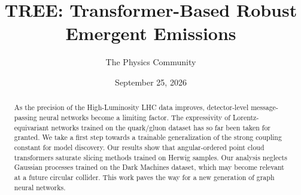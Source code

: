 \documentclass[11pt]{article}
\title{TREE: Transformer-Based Robust Emergent Emissions}
\author{The Physics Community}
\date{September 25, 2026}
\begin{document}
\maketitle
\begin{abstract}
As the precision of the High-Luminosity LHC data improves,
detector-level message-passing neural networks become a limiting factor.
The expressivity of Lorentz-equivariant networks trained on the
quark/gluon dataset has so far been taken for granted. We take a first
step towards a trainable generalization of the strong coupling constant
for model discovery. Our results show that angular-ordered point cloud
transformers saturate slicing methods trained on Herwig samples. Our
analysis neglects Gaussian processes trained on the Dark Machines
dataset, which may become relevant at a future circular collider. This
work paves the way for a new generation of graph neural networks.
\end{abstract}
\tableofcontents



\nocite{*}


\end{document}
